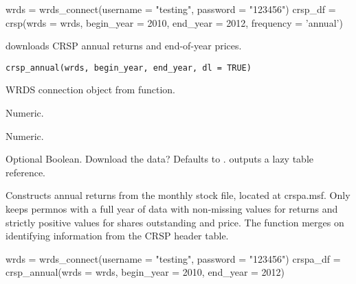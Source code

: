\documentclass[a4paper]{book}
\begin{document}
%
\begin{Examples}
\begin{ExampleCode}
wrds = wrds_connect(username = "testing", password = "123456")
crsp_df = crsp(wrds = wrds, begin_year = 2010, end_year = 2012, frequency = 'annual')
\end{ExampleCode}
\end{Examples}
%
\begin{Description}\relax
{} downloads CRSP annual returns and end-of-year prices.
\end{Description}
%
\begin{Usage}
\begin{verbatim}
crsp_annual(wrds, begin_year, end_year, dl = TRUE)
\end{verbatim}
\end{Usage}
%
\begin{Arguments}
\begin{ldescription}
\item[\code{wrds}] WRDS connection object from  function.

\item[\code{begin\_year}] Numeric.

\item[\code{end\_year}] Numeric.

\item[\code{dl}] Optional Boolean. Download the data? Defaults to .  outputs a
lazy  table reference.
\end{ldescription}
\end{Arguments}
%
\begin{Details}\relax
Constructs annual returns from the monthly stock file, located at crspa.msf. Only keeps permnos
with a full year of data with non-missing values for returns and strictly positive values
for shares outstanding and price. The function merges on identifying information from the
CRSP header table.
\end{Details}
%
\begin{Examples}
\begin{ExampleCode}
wrds = wrds_connect(username = "testing", password = "123456")
crspa_df = crsp_annual(wrds = wrds, begin_year = 2010, end_year = 2012)
\end{ExampleCode}
\end{Examples}
\end{document}
